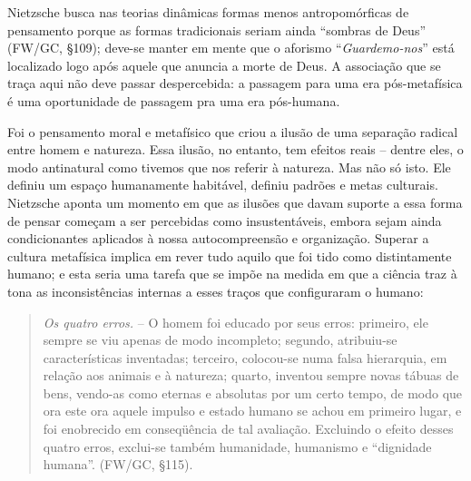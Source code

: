 \documentclass[
	12pt,				%
	openright,			%
	oneside,			%
	a4paper,			%
	english,			%
	french,				%
	spanish,			%
	brazil				%
	]{abntex2}
\begin{document}
Nietzsche busca nas teorias dinâmicas formas menos antropomórficas de pensamento porque as formas tradicionais seriam ainda “sombras de Deus” (FW/GC, §109); deve-se manter em mente que o aforismo “\textit{Guardemo-nos}” está localizado logo após aquele que anuncia a morte de Deus. A associação que se traça aqui não deve passar despercebida: a passagem para uma era pós-metafísica é uma oportunidade de passagem pra uma era pós-humana. 

Foi o pensamento moral e metafísico que criou a ilusão de uma separação radical entre homem e natureza. Essa ilusão, no entanto, tem efeitos reais – dentre eles, o modo antinatural como tivemos que nos referir à natureza. Mas não só isto. Ele definiu um espaço humanamente habitável, definiu padrões e metas culturais. Nietzsche aponta um momento em que as ilusões que davam suporte a essa forma de pensar começam a ser percebidas como insustentáveis, embora sejam ainda  condicionantes aplicados à nossa autocompreensão e organização. Superar a cultura metafísica implica em rever tudo aquilo que foi tido como distintamente humano; e esta seria uma tarefa que se impõe na medida em que a ciência traz à tona as inconsistências internas a esses traços que configuraram o humano:

\begin{quotation}
\textit{Os quatro erros.} – O homem foi educado por seus erros: primeiro, ele sempre se viu apenas de modo incompleto; segundo, atribuiu-se características inventadas; terceiro, colocou-se numa falsa hierarquia, em relação aos animais e à natureza; quarto, inventou sempre novas tábuas de bens, vendo-as como eternas e absolutas por um certo tempo, de modo que ora este ora aquele impulso e estado humano se achou em primeiro lugar, e foi enobrecido em conseqüência de tal avaliação. Excluindo o efeito desses quatro erros, exclui-se também humanidade, humanismo e “dignidade humana”. (FW/GC, §115). 
\end{quotation}
\end{document}
